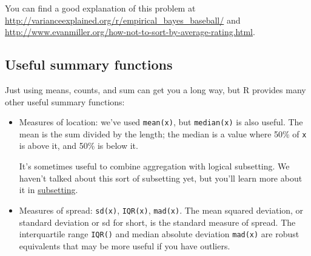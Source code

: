 \documentclass[]{book}
\newenvironment{Shaded}{\begin{snugshade}}{\end{snugshade}}
\newcommand{\KeywordTok}[1]{\textcolor[rgb]{0.13,0.29,0.53}{\textbf{{#1}}}}
\newcommand{\DataTypeTok}[1]{\textcolor[rgb]{0.13,0.29,0.53}{{#1}}}
\newcommand{\DecValTok}[1]{\textcolor[rgb]{0.00,0.00,0.81}{{#1}}}
\newcommand{\StringTok}[1]{\textcolor[rgb]{0.31,0.60,0.02}{{#1}}}
\newcommand{\CommentTok}[1]{\textcolor[rgb]{0.56,0.35,0.01}{\textit{{#1}}}}
\newcommand{\NormalTok}[1]{{#1}}
\begin{document}
You can find a good explanation of this problem at
\url{http://varianceexplained.org/r/empirical_bayes_baseball/} and
\url{http://www.evanmiller.org/how-not-to-sort-by-average-rating.html}.

\subsection{Useful summary functions}\label{summarise-funs}

Just using means, counts, and sum can get you a long way, but R provides
many other useful summary functions:

\begin{itemize}
\item
  Measures of location: we've used \texttt{mean(x)}, but
  \texttt{median(x)} is also useful. The mean is the sum divided by the
  length; the median is a value where 50\% of \texttt{x} is above it,
  and 50\% is below it.

  It's sometimes useful to combine aggregation with logical subsetting.
  We haven't talked about this sort of subsetting yet, but you'll learn
  more about it in \protect\hyperlink{subsetting-1}{subsetting}.

\begin{Shaded}
\end{Shaded}
\item
  Measures of spread: \texttt{sd(x)}, \texttt{IQR(x)}, \texttt{mad(x)}.
  The mean squared deviation, or standard deviation or sd for short, is
  the standard measure of spread. The interquartile range \texttt{IQR()}
  and median absolute deviation \texttt{mad(x)} are robust equivalents
  that may be more useful if you have outliers.


\end{itemize}
\end{document}
